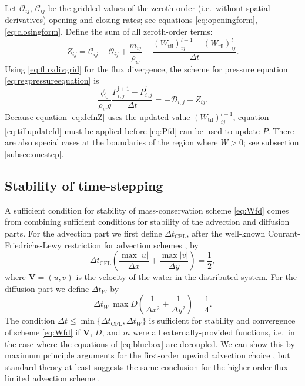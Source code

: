 \documentclass[gmd]{copernicus}   %
\newcommand{\text}{\textrm}
\newcommand{\Wtil}{W_{\text{til}}}
\newcommand{\Plij}{P^l_{i,j}}
\begin{document}
Let $\mathcal{O}_{ij}$, $\mathcal{C}_{ij}$ be the gridded values of the zeroth-order (i.e.~without spatial derivatives) opening and closing rates; see equations \eqref{eq:openingform}, \eqref{eq:closingform}.  Define the sum of all zeroth-order terms:
\begin{equation}
Z_{ij} = \mathcal{C}_{ij} - \mathcal{O}_{ij} + \frac{m_{ij}}{\rho_w} - \frac{(\Wtil)_{ij}^{l+1} - (\Wtil)_{ij}^l}{\Delta t}.  \label{eq:defnZ}
\end{equation}
Using \eqref{eq:fluxdivgrid} for the flux divergence, the scheme for pressure equation \eqref{eq:regpressureequation} is
\begin{equation}
\frac{\phi_0}{\rho_w g} \frac{P_{i,j}^{l+1} - \Plij}{\Delta t} = - \mathcal{D}_{i,j} + Z_{ij}. \label{eq:Pfd}
\end{equation}
Because equation \eqref{eq:defnZ} uses the updated value $(\Wtil)_{ij}^{l+1}$, equation \eqref{eq:tillupdatefd} must be applied before \eqref{eq:Pfd} can be used to update $P$.  There are also special cases at the boundaries of the region where $W>0$; see subsection \ref{subsec:onestep}.

\subsection{Stability of time-stepping}  A sufficient condition for stability of mass-conservation scheme \eqref{eq:Wfd} comes from combining sufficient conditions for stability of the advection and diffusion parts.  For the advection part we first define $\Delta t_{\text{CFL}}$, after the well-known Courant-Friedrichs-Lewy restriction for advection schemes \citep{MortonMayers}, by
\begin{equation}
\Delta t_{\text{CFL}} \left(\frac{\max |u|}{\Delta x} + \frac{\max |v|}{\Delta y}\right) = \frac{1}{2}, \label{eq:dtCFL}
\end{equation}
where $\mathbf{V}=(u,v)$ is the velocity of the water in the distributed system.  For the diffusion part we define $\Delta t_{W}$ by
\begin{equation}
\Delta t_W\, \max D \left(\frac{1}{\Delta x^2} + \frac{1}{\Delta y^2}\right) = \frac{1}{4}. \label{eq:dtDIFFW}
\end{equation}
The condition $\Delta t \le \min\{\Delta t_{\text{CFL}}, \Delta t_W\}$ is sufficient for stability and convergence of scheme \eqref{eq:Wfd} if $\mathbf{V}$, $D$, and $m$ were all externally-provided functions, i.e.~in the case where the equations of \eqref{eq:bluebox} are decoupled.  We can show this by maximum principle arguments for the first-order upwind advection choice \citep{MortonMayers}, but standard theory at least suggests the same conclusion for the higher-order flux-limited advection scheme \citep{HundsdorferVerwer2010}.
\end{document}
